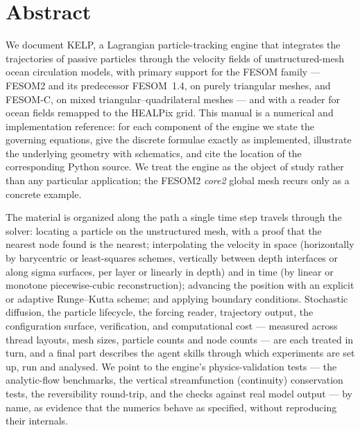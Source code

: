 \chapter*{Abstract}

We document \textsf{KELP}, a Lagrangian particle-tracking engine that
integrates the trajectories of passive particles through the velocity fields of
unstructured-mesh ocean circulation models, with primary support for the FESOM
family --- FESOM2 and its predecessor FESOM~1.4, on purely triangular meshes, and FESOM-C, on mixed
triangular--quadrilateral meshes --- and with a reader for ocean fields remapped to the HEALPix grid.
This manual is a numerical and implementation reference: for each component of
the engine we state the governing equations, give the discrete formulae exactly
as implemented, illustrate the underlying geometry with schematics, and cite the
location of the corresponding Python source. We treat the engine as the object of
study rather than any particular application; the FESOM2 \emph{core2} global mesh recurs only as a
concrete example.

The material is organized along the path a single time step travels through the
solver: locating a particle on the unstructured mesh, with a proof that the nearest node found is the
nearest; interpolating the velocity in space (horizontally by barycentric or least-squares schemes,
vertically between depth interfaces or along sigma surfaces, per layer or linearly in depth) and in time (by linear or monotone
piecewise-cubic reconstruction); advancing the position with an explicit or adaptive Runge--Kutta
scheme; and applying boundary conditions. Stochastic diffusion, the particle lifecycle, the
forcing reader, trajectory output, the configuration surface, verification, and
computational cost --- measured across thread layouts, mesh sizes, particle counts and node counts ---
are each treated in turn, and a final part describes the agent skills through which experiments are set
up, run and analysed. We point to the engine's
physics-validation tests --- the analytic-flow benchmarks, the vertical streamfunction
(continuity) conservation tests, the reversibility round-trip, and the checks against real model
output --- by name, as evidence that the
numerics behave as specified, without reproducing their internals.
